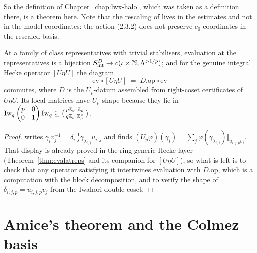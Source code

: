 So the definition of Chapter~\ref{chap:lwx-halo}, which was taken as a definition there, is a
theorem here.  Note that the rescaling of \cite[(5.4.1)]{LWX} lives in the estimates and not in
the model coordinates: the action (2.3.2) does not preserve $c_0$-coordinates in the rescaled
basis.

\begin{theorem}
  \label{thm:prop31}
  \leanok
  At a family of class representatives with trivial stabilisers, evaluation at the
  representatives is a bijection $S^{D}_{\mathrm{int}} \to c(\iota\times\mathbb{N},\Lambda^{>1/p})$; and for the
  genuine integral Hecke operator $[U\eta U]$ the diagram
  \[
    \mathrm{ev}\circ[U\eta U] \;=\; D.\mathrm{op}\circ\mathrm{ev}
  \]
  commutes, where $D$ is the $U_p$-datum assembled from right-coset certificates of $U\eta U$.
  Its local matrices have $U_p$-shape because they lie in
  $\operatorname{Iw}_q\begin{pmatrix} p&0\\0&1\end{pmatrix}\operatorname{Iw}_q \subseteq
  \bigl(\begin{smallmatrix} p\mathbb{Z}_p&\mathbb{Z}_p\\ q\mathbb{Z}_p&\mathbb{Z}_p^{\times}\end{smallmatrix}\bigr)$.
\end{theorem}

\begin{proof}
  \leanok
  \cite[Proposition 3.1]{LWX} writes $\gamma_i v_j^{-1} = \delta_{i,j}^{-1}\gamma_{\lambda_{i,j}}
  u_{i,j}$ and finds $(U_p\varphi)(\gamma_i) = \sum_j \varphi(\gamma_{\lambda_{i,j}})
  \Vert_{u_{i,j,p}v_j}$.  That display is already proved in the ring-generic Hecke layer
  (Theorem~\ref{thm:evalatreps} and its companion for $[U\eta U]$), so what is left is to check
  that any operator satisfying it intertwines evaluation with $D.\mathrm{op}$, which is a
  computation with the block decomposition, and to verify the shape of
  $\delta_{i,j,p} = u_{i,j,p}v_j$ from the Iwahori double coset.
\end{proof}

\section{Amice's theorem and the Colmez basis}
\label{sec:amice}

